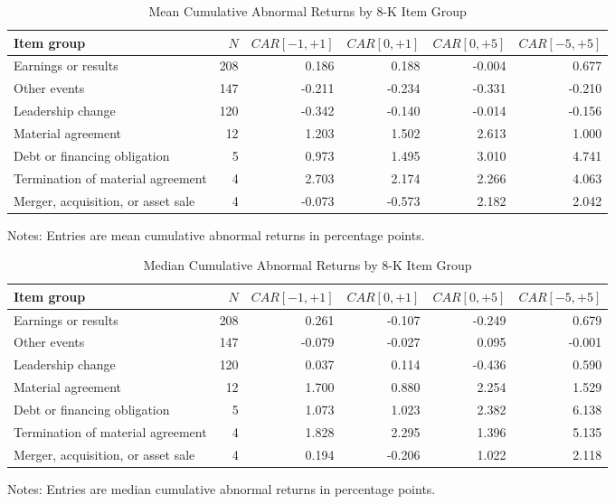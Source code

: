 \documentclass[12pt]{article}
\begin{document}
\begin{table}[H]
\centering
\begin{threeparttable}
\caption{Mean Cumulative Abnormal Returns by 8-K Item Group}
\label{tab:car_means}
\small
\setlength{\tabcolsep}{4pt}
\begin{tabular}{p{}rrrrr}
\toprule
Item group & $N$ &
$CAR[-1,+1]$ &
$CAR[0,+1]$ &
$CAR[0,+5]$ &
$CAR[-5,+5]$ \\
\midrule
Earnings or results & 208 & 0.186 & 0.188 & -0.004 & 0.677 \\
Other events & 147 & -0.211 & -0.234 & -0.331 & -0.210 \\
Leadership change & 120 & -0.342 & -0.140 & -0.014 & -0.156 \\
Material agreement & 12 & 1.203 & 1.502 & 2.613 & 1.000 \\
Debt or financing obligation & 5 & 0.973 & 1.495 & 3.010 & 4.741 \\
Termination of material agreement & 4 & 2.703 & 2.174 & 2.266 & 4.063 \\
Merger, acquisition, or asset sale & 4 & -0.073 & -0.573 & 2.182 & 2.042 \\
\bottomrule
\end{tabular}
\begin{tablenotes}
\small
\item Notes: Entries are mean cumulative abnormal returns in percentage points.
\end{tablenotes}
\end{threeparttable}
\end{table}

\begin{table}[H]
\centering
\begin{threeparttable}
\caption{Median Cumulative Abnormal Returns by 8-K Item Group}
\label{tab:car_medians}
\small
\setlength{\tabcolsep}{4pt}
\begin{tabular}{p{}rrrrr}
\toprule
Item group & $N$ &
$CAR[-1,+1]$ &
$CAR[0,+1]$ &
$CAR[0,+5]$ &
$CAR[-5,+5]$ \\
\midrule
Earnings or results & 208 & 0.261 & -0.107 & -0.249 & 0.679 \\
Other events & 147 & -0.079 & -0.027 & 0.095 & -0.001 \\
Leadership change & 120 & 0.037 & 0.114 & -0.436 & 0.590 \\
Material agreement & 12 & 1.700 & 0.880 & 2.254 & 1.529 \\
Debt or financing obligation & 5 & 1.073 & 1.023 & 2.382 & 6.138 \\
Termination of material agreement & 4 & 1.828 & 2.295 & 1.396 & 5.135 \\
Merger, acquisition, or asset sale & 4 & 0.194 & -0.206 & 1.022 & 2.118 \\
\bottomrule
\end{tabular}
\begin{tablenotes}
\small
\item Notes: Entries are median cumulative abnormal returns in percentage points.
\end{tablenotes}
\end{threeparttable}
\end{table}
\end{document}
